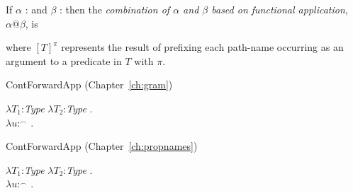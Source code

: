 If $\alpha$ :  
and $\beta$ : 
                         then the \textit{combination of $\alpha$ and
    $\beta$  based on functional application}, $\alpha\text{@}\beta$, is
\begin{quote}
\end{quote}
where $[T]^\pi$ represents the result of prefixing each path-name
occurring as an argument to a predicate in $T$ with $\pi$.

ContForwardApp (Chapter~\ref{ch:gram})

$\lambda T_1$:\textit{Type} $\lambda T_2$:\textit{Type} . \\
\hspace*{1em}$\lambda
u$:$^{\frown}$ . \\
\hspace*{2em}

ContForwardApp (Chapter~\ref{ch:propnames})

$\lambda T_1$:\textit{Type} $\lambda T_2$:\textit{Type} . \\
\hspace*{1em}$\lambda
u$:$^{\frown}$
    . \\
\hspace*{2em} 

